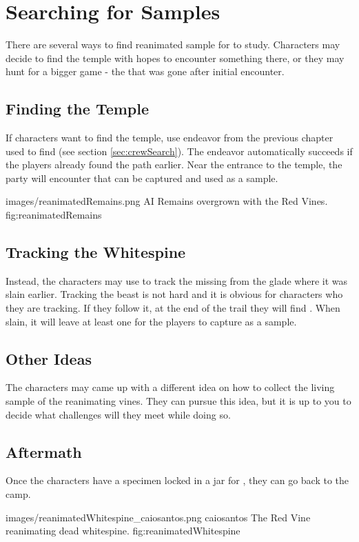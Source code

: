 \section{Searching for Samples}

There are several ways to find reanimated sample for \npcMedic{} to study. Characters may decide to find the temple with hopes to encounter something there, or they may hunt for a bigger game - the \enemyReanimatedWhitespine{} that was gone after initial encounter.

\subsection{Finding the Temple}

If characters want to find the temple, use endeavor from the previous chapter used to find \npcDeadExplorer{} (see section \ref{sec:crewSearch}). The endeavor automatically succeeds if the players already found the path earlier. Near the entrance to the temple, the party will encounter \enemyReanimatedRemains{} that can be captured and used as a sample.

					{images/reanimatedRemains.png}
					{AI}
					{Remains overgrown with the Red Vines.}
					{fig:reanimatedRemains}


\subsection{Tracking the Whitespine}

Instead, the characters may use  to track the \enemyWhitespine{} missing from the glade where it was slain earlier. Tracking the beast is not hard and it is obvious for characters who they are tracking. If they follow it, at the end of the trail they will find \enemyReanimatedWhitespine{}. When slain, it will leave at least one \enemyReanimatedRemains{} for the players to capture as a sample.


\subsection{Other Ideas}

The characters may came up with a different idea on how to collect the living sample of the reanimating vines. They can pursue this idea, but it is up to you to decide what challenges will they meet while doing so.

\subsection{Aftermath}

Once the characters have a specimen locked in a jar for \npcMedic{}, they can go back to the camp.

					{images/reanimatedWhitespine_caiosantos.png}
					{caiosantos}
					{The Red Vine reanimating dead whitespine.}
					{fig:reanimatedWhitespine}